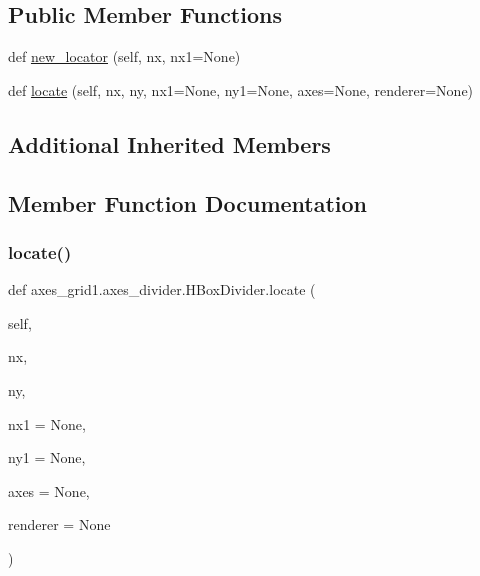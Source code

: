 \subsection*{Public Member Functions}
\begin{DoxyCompactItemize}
\item 
def \hyperlink{classaxes__grid1_1_1axes__divider_1_1HBoxDivider_ae4329d234322f7fa23ff725c4035cc21}{new\+\_\+locator} (self, nx, nx1=None)
\item 
def \hyperlink{classaxes__grid1_1_1axes__divider_1_1HBoxDivider_a1be73d27cdcd0c04a9ddbf81511922ac}{locate} (self, nx, ny, nx1=None, ny1=None, axes=None, renderer=None)
\end{DoxyCompactItemize}
\subsection*{Additional Inherited Members}


\subsection{Member Function Documentation}
\mbox{\label{classaxes__grid1_1_1axes__divider_1_1HBoxDivider_a1be73d27cdcd0c04a9ddbf81511922ac}} 
\subsubsection{\texorpdfstring{locate()}{locate()}}
{\footnotesize\ttfamily def axes\+\_\+grid1.\+axes\+\_\+divider.\+H\+Box\+Divider.\+locate (\begin{DoxyParamCaption}\item[{}]{self,  }\item[{}]{nx,  }\item[{}]{ny,  }\item[{}]{nx1 = {\ttfamily None},  }\item[{}]{ny1 = {\ttfamily None},  }\item[{}]{axes = {\ttfamily None},  }\item[{}]{renderer = {\ttfamily None} }\end{DoxyParamCaption})}

